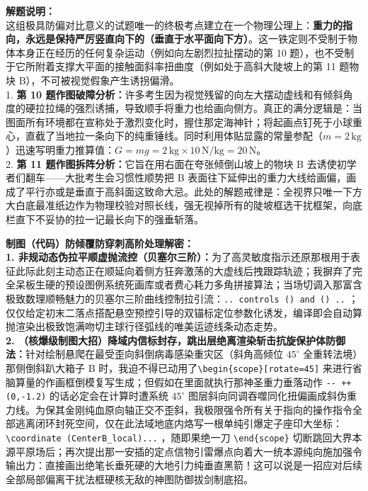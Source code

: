 {\small\color{gray}
\textbf{解题说明：}\\
这组极具防偏对比意义的试题唯一的终极考点建立在一个物理公理上：\textbf{重力的指向，永远是保持严厉竖直向下的（垂直于水平面向下方）}。这一铁定则不受制于物体本身正在经历的任何复杂运动（例如向左剧烈拉扯摆动的第 10 题），也不受制于它所附着支撑大平面的接触面斜率扭曲度（例如处于高斜大陡坡上的第 11 题物块 B），不可被视觉假象产生诱拐偏滑。\\
1. \textbf{第 10 题作图破障分析：}许多考生因为视觉残留的向左大摆动虚线和有倾斜角度的硬拉拉绳的强烈诱捕，导致顺手将重力也给画向侧方。真正的满分逻辑是：当图面所有环境都在宣称处于激烈变化时，握住那定海神针；将起画点钉死于小球重心，直截了当地拉一条向下的纯重锤线。同时利用体贴显露的常量参配（$m=2\,\text{kg}$）迅速写明重力推算值：$G = mg = 2\,\text{kg} \times 10\,\text{N/kg} = 20\,\text{N}$。\\
2. \textbf{第 11 题作图拆阵分析：}它旨在用右面在夸张倾倒山坡上的物块 B 去诱使初学者们翻车——大批考生会习惯性顺势把 B 表面往下延伸出的重力大线给画偏，画成了平行亦或是垂直于高斜面这致命大忌。此处的解题戒律是：全视界只唯一下方大白底最准纸边作为物理校验对照长线，强无视掉所有的陡坡框选干扰框架，向底栏直下不妥协的拉一记最长向下的强垂斩落。
}

\vspace{0.6cm}

{\small\color{blue!70!black}
\textbf{制图（代码）防倾覆防穿刺高阶处理解密：}\\
\textbf{1. 非规动态伪拉平顺虚抛流控（贝塞尔三阶）：}为了高灵敏度指示还原那根用于表征此际此刻主动态正在顺延向着侧方狂奔激荡的大虚线后拽跟踪轨迹；我摒弃了完全呆板生硬的预设图例系统死画库或者费心耗力多角拼接算法；当场切调入那富含极致数理顺畅魅力的贝塞尔三阶曲线控制拉引流：\texttt{.. controls () and () ..} ；仅仅给定初末二落点搭配悬空预控引导的双锚标定位参数化诱发，编译即会自动算抛渲染出极致饱满吻切主球行径弧线的唯美运迹线条动态走势。\\
\textbf{2. （核爆级制图大招）降域内信标封存，跳出层绝离渲染斩击抗旋保护体防御法：}针对绘制悬爬在最受歪向斜倒病毒感染重灾区（斜角高倾位 $45^\circ$ 全重转法境）那侧倒斜趴大箱子 B 时，我迫不得已动用了\texttt{\textbackslash begin\{scope\}[rotate=45]} 来进行省脑算量的作画框倒模复写生成；但假如在里面就执行那神圣重力垂落动作 \texttt{-{}- ++(0,-1.2)} 的话必定会在计算时遭系统 $45^\circ$ 图层斜向同调吞噬同化扭偏画成斜伪重力线。为保其金刚纯血原向轴正交不歪斜，我极限强令所有关于指向的操作指令全部逃离闭环封死空间，仅在此法域地底内烙写一根单纯引爆定子座印大坐标：\texttt{\textbackslash coordinate (CenterB\_local)...} ，随即果绝一刀 \texttt{\textbackslash end\{scope\}} 切断跳回大界本源平原场后；再次提出那一安插的定点信物引雷爆点向着大一统本源纯向施加强令输出力：直接画出绝笔长垂死硬的大地引力纯垂直黑箭！这可以说是一招应对后续全部局部偏离干扰法框硬核无敌的神图防御拔剑制底招。
}

